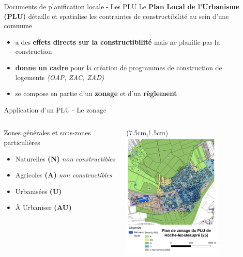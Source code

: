 \documentclass[xcolor=table]{beamer}
\begin{document}
\begin{frame}{Documents de planification locale - Les PLU}
Le \textbf{Plan Local de l’Urbanisme (PLU)} détaille et spatialise les contraintes de constructibilité au sein d’une commune
\begin{itemize}
\item a des \textbf{effets directs sur la constructibilité} mais ne planifie pas la construction 
\item \textbf{donne un cadre} pour la création de programmes de construction de logements \textit{(OAP, ZAC, ZAD)}
\item se compose en partie d'un \textbf{zonage} et d'un \textbf{règlement}
\end{itemize}
\end{frame}	

\begin{frame}{Application d'un PLU - Le zonage}
\begin{columns}[T]
\begin{column}[T]{7cm}
Zones générales et sous-zones particulières
\begin{itemize}
\item \alert{Naturelles} \textbf{(N)} \emph{non constructibles}
\item \alert{Agricoles} \textbf{(A)} \emph{non constructibles}
\item \alert{Urbanisées} \textbf{(U)}
\item \alert{À Urbaniser} \textbf{(AU)}
\end{itemize}
\end{column}
\begin{column}[T]{4cm}
\begin{textblock*}{6cm}(7.5cm,1.5cm)
\includegraphics[width=5cm]{cartes/plu-roche.png}
\end{textblock*}	
\end{column}
\end{columns}

\end{frame}
\end{document}
